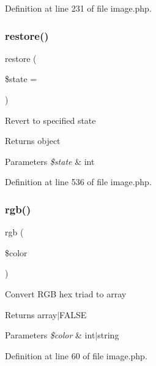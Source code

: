 Definition at line 231 of file image.\+php.

\hypertarget{class_image_a6c2fdbe1df4f3168e741037c8be1a7c0}{}\label{class_image_a6c2fdbe1df4f3168e741037c8be1a7c0} 
\subsubsection{\texorpdfstring{restore()}{restore()}}
{\footnotesize\ttfamily restore (\begin{DoxyParamCaption}\item[{}]{\$state = {} }\end{DoxyParamCaption})}

Revert to specified state \begin{DoxyReturn}{Returns}
object 
\end{DoxyReturn}

\begin{DoxyParams}{Parameters}
{\em \$state} & int \\
\hline
\end{DoxyParams}


Definition at line 536 of file image.\+php.

\hypertarget{class_image_ab2758ab5d8c1d2cd3c4e48b72daed2d9}{}\label{class_image_ab2758ab5d8c1d2cd3c4e48b72daed2d9} 
\subsubsection{\texorpdfstring{rgb()}{rgb()}}
{\footnotesize\ttfamily rgb (\begin{DoxyParamCaption}\item[{}]{\$color }\end{DoxyParamCaption})}

Convert R\+GB hex triad to array \begin{DoxyReturn}{Returns}
array$\vert$\+F\+A\+L\+SE 
\end{DoxyReturn}

\begin{DoxyParams}{Parameters}
{\em \$color} & int$\vert$string \\
\hline
\end{DoxyParams}


Definition at line 60 of file image.\+php.

\hypertarget{class_image_a4295061e879c4cc714213bf14116d346}{}\label{class_image_a4295061e879c4cc714213bf14116d346} 
